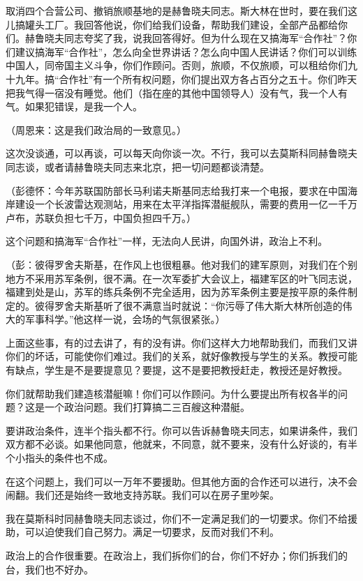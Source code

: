 取消四个合营公司、撤销旅顺基地的是赫鲁晓夫同志。斯大林在世时，要在我们这儿搞罐头工厂。我回答他说，你们给我们设备，帮助我们建设，全部产品都给你们。赫鲁晓夫同志夸奖了我，说我回答得好。但为什么现在又搞海军“合作社”？你们建议搞海军“合作社”，怎么向全世界讲话？怎么向中国人民讲话？你们可以训练中国人，同帝国主义斗争，你们作顾问。否则，旅顺，不仅旅顺，可以租给你们九十九年。搞“合作社”有一个所有权问题，你们提出双方各占百分之五十。你们昨天把我气得一宿没有睡觉。他们（指在座的其他中国领导人）没有气，我一个人有气。如果犯错误，是我一个人。

（周恩来：这是我们政治局的一致意见。）

这次没谈通，可以再谈，可以每天向你谈一次。不行，我可以去莫斯科同赫鲁晓夫同志谈，或者请赫鲁晓夫同志来北京，把一切问题都谈清楚。

（彭德怀：今年苏联国防部长马利诺夫斯基同志给我打来一个电报，要求在中国海岸建设一个长波雷达观测站，用来在太平洋指挥潜艇舰队，需要的费用一亿一千万卢布，苏联负担七千万，中国负担四千万。）

这个问题和搞海军“合作社”一样，无法向人民讲，向国外讲，政治上不利。

（彭：彼得罗舍夫斯基，在作风上也很粗暴。他对我们的建军原则，对我们在个别地方不采用苏军条例，很不满。在一次军委扩大会议上，福建军区的叶飞同志说，福建到处是山，苏军的练兵条例不完全适用，因为苏军条例主要是按平原的条件制定的。彼得罗舍夫斯基听了很不满意当时就说：“你污辱了伟大斯大林所创造的伟大的军事科学。”他这样一说，会场的气氛很紧张。）

上面这些事，有的过去讲了，有的没有讲。你们这样大力地帮助我们，而我们又讲你们的坏话，可能使你们难过。我们的关系，就好像教授与学生的关系。教授可能有缺点，学生是不是要提意见？要提，这不是要把教授赶走，教授还是好教授。

你们就帮助我们建造核潜艇嘛！你们可以作顾问。为什么要提出所有权各半的问题？这是一个政治问题。我们打算搞二三百艘这种潜艇。

要讲政治条件，连半个指头都不行。你可以告诉赫鲁晓夫同志，如果讲条件，我们双方都不必谈。如果他同意，他就来，不同意，就不要来，没有什么好谈的，有半个小指头的条件也不成。

在这个问题上，我们可以一万年不要援助。但其他方面的合作还可以进行，决不会闹翻。我们还是始终一致地支持苏联。我们可以在房子里吵架。

我在莫斯科时同赫鲁晓夫同志谈过，你们不一定满足我们的一切要求。你们不给援助，可以迫使我们自己努力。满足一切要求，反而对我们不利。

政治上的合作很重要。在政治上，我们拆你们的台，你们不好办；你们拆我们的台，我们也不好办。

